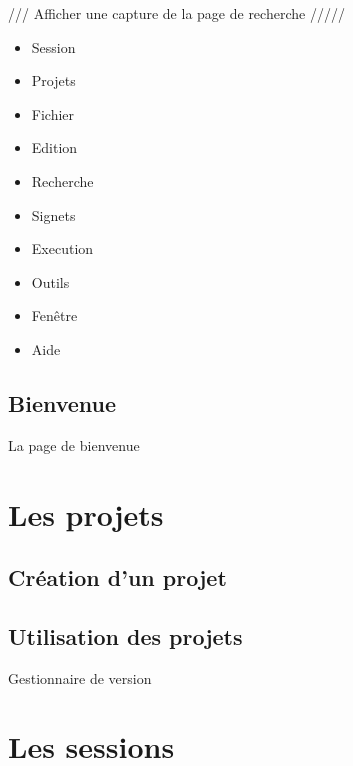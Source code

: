 \documentclass[a4paper,10pt,twoside]{book}
\begin{document}
/// Afficher une capture de la page de recherche /////




\begin{itemize}
  \item Session 
  \item Projets
  \item Fichier
  \item Edition
  \item Recherche
  \item Signets
  \item Execution
  \item Outils
  \item Fenêtre
  \item Aide
\end{itemize}

\subsection{Bienvenue}
\label{sub:bienvenue}

La page de bienvenue

\section{Les projets}
\label{sec:Projets}

\subsection{Création d'un projet}

\subsection{Utilisation des projets}
\label{sec:RCS}
Gestionnaire de version

\section{Les sessions}
\label{sec:Sessions}
\end{document}
